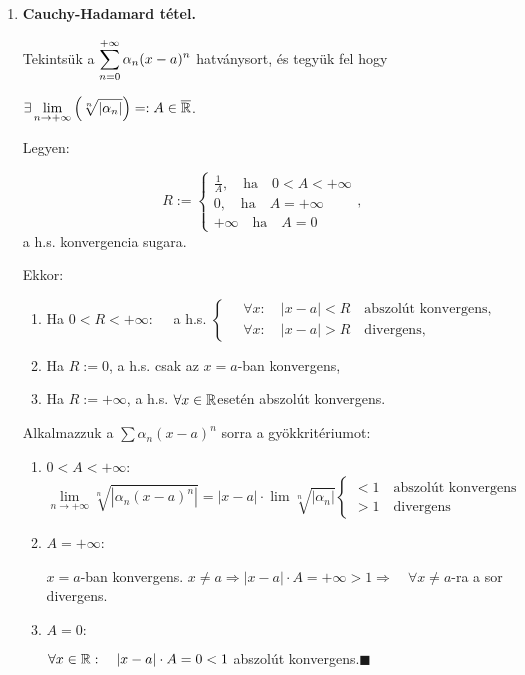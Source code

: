 \documentclass[a4paper,11.5pt]{article}
\begin{document}
\begin{enumerate}
		\item \textbf{Cauchy-Hadamard tétel.}
		
		Tekintsük a $\displaystyle\sum_{n=0}^{+\infty} \alpha_n(x-a)^n$ hatványsort, és tegyük fel hogy
		
		$\displaystyle\exists\lim_{n\to+\infty}\left(\sqrt[n]{|\alpha_n|}\right)=:A\in\overline{\mathbb{R}}$.
		
		Legyen:
		
		\[ R:=\left\{
		\begin{gathered}
		\frac{1}{A}, \quad \text{ha}\quad 0<A<+\infty\\
		0, \quad \text{ha}\quad A=+\infty\\
		+\infty \quad \text{ha}\quad A=0
		\end{gathered}\right., \]
		a h.s. konvergencia sugara.
		
		Ekkor:\begin{enumerate}
			\item Ha $ 0<R<+\infty:\quad$ a h.s.
			$\left\{\begin{gathered}
			\quad\forall x: \quad |x-a|<R \quad \text{abszolút konvergens,}\\
			\quad\forall x: \quad |x-a|>R \quad \text{divergens,}
			\end{gathered}\right. $
			\item Ha $R:=0$, a h.s. csak az $x=a$-ban konvergens,
			\item Ha $R:=+\infty$, a h.s. $\forall x \in \mathbb{R}$\quad esetén abszolút konvergens.
		\end{enumerate}
		
		\biz Alkalmazzuk a $\sum\alpha_n(x-a)^n$ sorra a gyökkritériumot:
		\begin{enumerate}
			\item $0<A<+\infty$:
			\[\lim_{n\to+\infty}\sqrt[n]{|\alpha_n(x-a)^n|}=|x-a|\cdot\lim\sqrt[n]{|\alpha_n|}
			\left\{\begin{gathered}
			<1\quad \text{abszolút konvergens}\\
			>1\quad \text{divergens}
			\end{gathered}\right.\]
			\item $A=+\infty$:
			
			$ x=a$-ban konvergens. $x\not=a \Rightarrow |x-a|\cdot A=+\infty>1 \Rightarrow \quad \forall x\not=a$-ra a sor divergens.
			\item $A=0:$
			
			$ \forall x\in\mathbb{R}:\quad |x-a|\cdot A=0<1$ abszolút konvergens.\quad $\blacksquare$
			
		\end{enumerate}
		

\end{enumerate}
\end{document}
